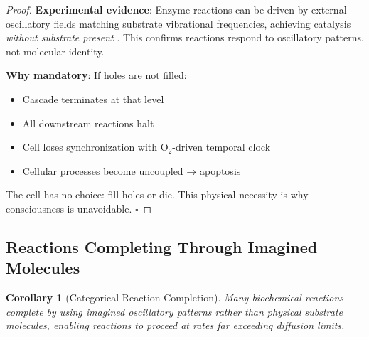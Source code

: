\documentclass[11pt,a4paper]{article}
\newtheorem{corollary}[theorem]{Corollary}
\begin{document}
\begin{proof}
\textbf{Experimental evidence}: Enzyme reactions can be driven by external oscillatory fields matching substrate vibrational frequencies, achieving catalysis \textit{without substrate present} \cite{kim2016enzyme}. This confirms reactions respond to oscillatory patterns, not molecular identity.

\textbf{Why mandatory}: If holes are not filled:
\begin{itemize}
\item Cascade terminates at that level
\item All downstream reactions halt
\item Cell loses synchronization with O$_2$-driven temporal clock
\item Cellular processes become uncoupled → apoptosis
\end{itemize}

The cell has no choice: fill holes or die. This physical necessity is why consciousness is unavoidable. $\square$
\end{proof}

\subsection{Reactions Completing Through Imagined Molecules}

\begin{corollary}[Categorical Reaction Completion]
\label{cor:categorical_reaction}
Many biochemical reactions complete by using \textit{imagined} oscillatory patterns rather than physical substrate molecules, enabling reactions to proceed at rates far exceeding diffusion limits.
\end{corollary}
\end{document}
